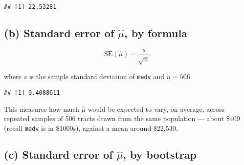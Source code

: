 \documentclass[
  11pt,
]{article}
\newenvironment{Shaded}{\begin{snugshade}}{\end{snugshade}}
\newcommand{\AttributeTok}[1]{\textcolor[rgb]{0.13,0.29,0.53}{#1}}
\newcommand{\ControlFlowTok}[1]{\textcolor[rgb]{0.13,0.29,0.53}{\textbf{#1}}}
\newcommand{\DecValTok}[1]{\textcolor[rgb]{0.00,0.00,0.81}{#1}}
\newcommand{\FunctionTok}[1]{\textcolor[rgb]{0.13,0.29,0.53}{\textbf{#1}}}
\newcommand{\NormalTok}[1]{#1}
\newcommand{\OtherTok}[1]{\textcolor[rgb]{0.56,0.35,0.01}{#1}}
\newcommand{\SpecialCharTok}[1]{\textcolor[rgb]{0.81,0.36,0.00}{\textbf{#1}}}
\begin{document}
\begin{verbatim}
## [1] 22.53281
\end{verbatim}

\subsection{\texorpdfstring{(b) Standard error of \(\hat\mu\), by
formula}{(b) Standard error of \textbackslash hat\textbackslash mu, by formula}}\label{b-standard-error-of-hatmu-by-formula}

\[
\text{SE}(\hat\mu) = \frac{s}{\sqrt{n}}
\]

where \(s\) is the sample standard deviation of \texttt{medv} and
\(n = 506\).

\begin{Shaded}
\end{Shaded}

\begin{verbatim}
## [1] 0.4088611
\end{verbatim}

This measures how much \(\hat\mu\) would be expected to vary, on
average, across repeated samples of 506 tracts drawn from the same
population --- about \$409 (recall \texttt{medv} is in \$1000s), against
a mean around \$22,530.

\subsection{\texorpdfstring{(c) Standard error of \(\hat\mu\), by
bootstrap}{(c) Standard error of \textbackslash hat\textbackslash mu, by bootstrap}}\label{c-standard-error-of-hatmu-by-bootstrap}

\begin{Shaded}
\end{Shaded}
\end{document}
